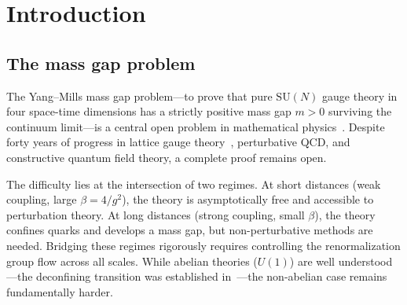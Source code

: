 \documentclass[11pt]{article}
\theoremstyle{definition}
\newcommand{\SU}{\mathrm{SU}}
\begin{document}
\begin{abstract}
non-Gaussian cluster expansion, and large-field decomposition with
recombination---is proved in full detail, with a rigorous inductive
closure verifying all four conditions of the RG hypothesis at each
scale.  The mass gap (correlation-length definition: exponential
clustering of connected correlators) is established directly from
KP convergence, uniformly in volume.  The continuum limit
($\beta\to\infty$) operates entirely in $\beta\ge\beta_0$, where the
cluster expansion converges and the mass gap bound holds
unconditionally.
As an auxiliary result, the temporal
transfer matrix in the character expansion basis gives
$m_t(\beta)>0$ for all $\beta>0$;
together with Jentzsch's theorem, this gives
$m(\beta,L)>0$ for every finite lattice.
\end{abstract}

\tableofcontents

\section{Introduction}\label{sec:intro}

\subsection{The mass gap problem}

The Yang--Mills mass gap problem---to prove that pure $\SU(N)$ gauge
theory in four space-time dimensions has a strictly positive mass gap
$m>0$ surviving the continuum limit---is a central open problem in
mathematical physics~\cite{JaffeWitten}.
Despite forty years of progress in lattice gauge
theory~\cite{Creutz80,OS73}, perturbative QCD, and constructive
quantum field theory, a complete proof remains open.

The difficulty lies at the intersection of two regimes.  At short
distances (weak coupling, large $\beta=4/g^2$), the theory is
asymptotically free and accessible to perturbation theory.  At long
distances (strong coupling, small $\beta$), the theory confines quarks
and develops a mass gap, but non-perturbative methods are needed.
Bridging these regimes rigorously requires controlling the renormalization
group flow across all scales.  While abelian theories ($U(1)$) are well
understood---the deconfining transition was established
in~\cite{Guth80,FS82}---the non-abelian case remains fundamentally harder.
\end{document}
